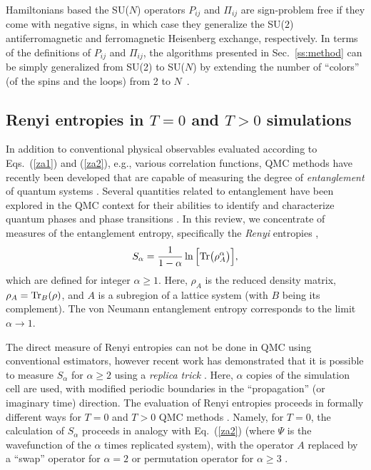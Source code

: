 \documentclass[range]{ar2e}
\begin{document}
Hamiltonians based the SU($N$) operators $P_{ij}$ and $\Pi_{ij}$ are sign-problem free if they come with negative signs, in which case
they generalize the SU($2$) antiferromagnetic and ferromagnetic Heisenberg exchange, respectively. In terms of the definitions of $P_{ij}$ and 
$\Pi_{ij}$, the algorithms presented in Sec.~\ref{ss:method} can be simply generalized from SU(2) to SU($N$) by extending the number of ``colors'' 
(of the spins and the loops) from 2 to $N$~\cite{harada2003:sun,beach2009:sun,kaul2011:j1j2}.

\subsection{Renyi entropies in $T=0$ and $T>0$ simulations} 
\label{ss:renyi}

In addition to conventional physical observables evaluated according to Eqs.~(\ref{za1}) and (\ref{za2}), e.g., various correlation functions, 
QMC methods have recently been developed that are capable of measuring the degree of {\it entanglement} of quantum systems \cite{EntangleMeasure}. Several 
quantities related to entanglement have been explored in the QMC context for their abilities to identify and characterize quantum phases and phase 
transitions \cite{Tommaso1,Tommaso2,fluc1,fluc2,fid1,fid2}.  In this review, we concentrate of measures of the entanglement entropy, specifically 
the {\it Renyi} entropies \cite{renyi},
\begin{equation}
S_{\alpha} = \frac{1}{1-\alpha} \ln \Big[ {\rm Tr}\big( \rho_A^{\alpha} \big) \Big],
\end{equation}
which are defined for integer $\alpha \ge 1$.  Here, $\rho_A$ is the reduced density matrix, $\rho_A = {\rm Tr}_B (\rho)$, and $A$ is a subregion of 
a lattice system (with $B$ being its complement). The von Neumann entanglement entropy corresponds to the limit $\alpha \to 1$.
 
The direct measure of Renyi entropies can not be done in QMC using conventional estimators, however recent work has demonstrated that it is possible to measure 
$S_{\alpha}$ for $\alpha \ge 2$ using a {\it replica trick} \cite{Holz,Cardy, Fradkin, BP, Naka}.  Here, $\alpha$ copies of the simulation cell are used, with modified 
periodic boundaries in the ``propagation'' (or imaginary time) direction.  The evaluation of Renyi entropies proceeds in formally different ways for $T=0$ and $T>0$ 
QMC methods \cite{Hastings10,Melko10}.  Namely, for $T=0$, the calculation of $S_{\alpha}$ proceeds in analogy with Eq.~(\ref{za2}) (where $\Psi$ is the wavefunction 
of the $\alpha$ times replicated system), with the operator $A$ replaced by a ``swap'' operator for $\alpha=2$ \cite{Hastings10} or permutation operator for 
$\alpha \ge 3$ \cite{Kallin11}. 
\end{document}
